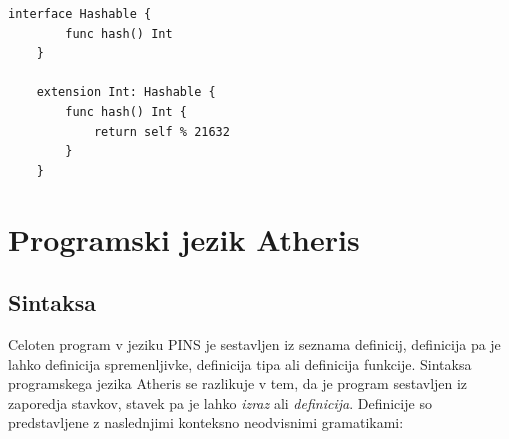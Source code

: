 \documentclass[a4paper, 12pt]{book}
\begin{document}
\begin{lstlisting}[caption=Primer razširitve tipa Int z vmesnikom Hashable, captionpos=b]
	interface Hashable {
		func hash() Int
	}

	extension Int: Hashable {
		func hash() Int {
			return self % 21632
		}
	}
\end{lstlisting}


\chapter{Programski jezik Atheris}
\label{ch1}


\section{Sintaksa}

Celoten program v jeziku PINS je sestavljen iz seznama definicij, definicija pa je lahko definicija spremenljivke, definicija tipa ali definicija funkcije. Sintaksa programskega jezika Atheris se razlikuje v tem, da je program sestavljen iz zaporedja stavkov, stavek pa je lahko \textit{izraz} ali \textit{definicija}. Definicije so predstavljene z naslednjimi konteksno neodvisnimi gramatikami:
\end{document}
